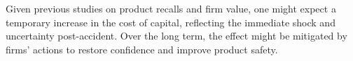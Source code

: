 \documentclass[12pt,a4paper]{article}
\begin{document}
    \hspace{1cm} Given previous studies on product recalls and firm value, one might expect a temporary increase in the cost of capital, reflecting the immediate shock and uncertainty post-accident. Over the long term, the effect might be mitigated by firms' actions to restore confidence and improve product safety.









\clearpage  %
\end{document}
